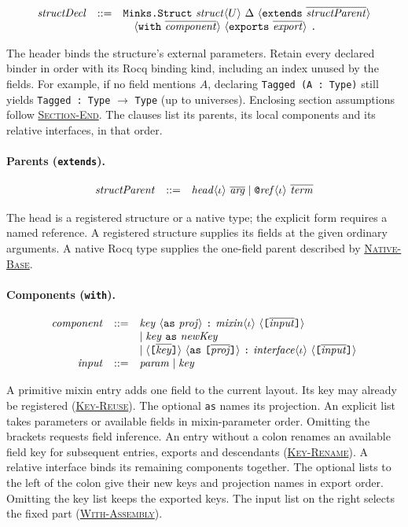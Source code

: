 \documentclass{article}
\newcommand{\ttt}[1]{\texttt{#1}}
\newcommand{\ruse}[1]{\hyperlink{rule-#1}{\textsc{#1}}}
\begin{document}
\[
\begin{array}{@{}rcl@{}}
\grammarStructDecl
\end{array}
\]

The header binds the structure's external parameters. Retain every declared
binder in order with its Rocq binding kind, including an index unused by
the fields. For example, if no field mentions $A$, declaring
\ttt{Tagged (A : Type)} still yields \ttt{Tagged : Type} $\to$ \ttt{Type}
(up to universes). Enclosing section assumptions follow \ruse{Section-End}. The clauses list
its parents, its local components and its relative interfaces, in that order.

\paragraph{Parents (\texttt{extends}).}

\[
\begin{array}{@{}rcl@{}}
\grammarStructParent
\end{array}
\]

The head is a registered structure or a native type; the explicit form
requires a named reference. A registered structure supplies its fields at
the given ordinary arguments. A native Rocq type supplies the one-field parent described
by \ruse{Native-Base}.

\paragraph{Components (\texttt{with}).}

\[
\begin{array}{@{}rcl@{}}
\grammarComponent\\
\grammarInput
\end{array}
\]

A primitive mixin entry adds one field to the current layout. Its key
may already be registered (\ruse{Key-Reuse}). The optional \ttt{as} names its
projection. An explicit list takes parameters or available fields in
mixin-parameter order. Omitting the brackets requests field inference.
An entry without a colon renames an available field key for subsequent
entries, exports and descendants (\ruse{Key-Rename}).
A relative interface binds its remaining components together. The optional
lists to the left of the colon give their new keys and projection names in
export order. Omitting the key list keeps the exported keys. The input list
on the right selects the fixed part (\ruse{With-Assembly}).
\end{document}
